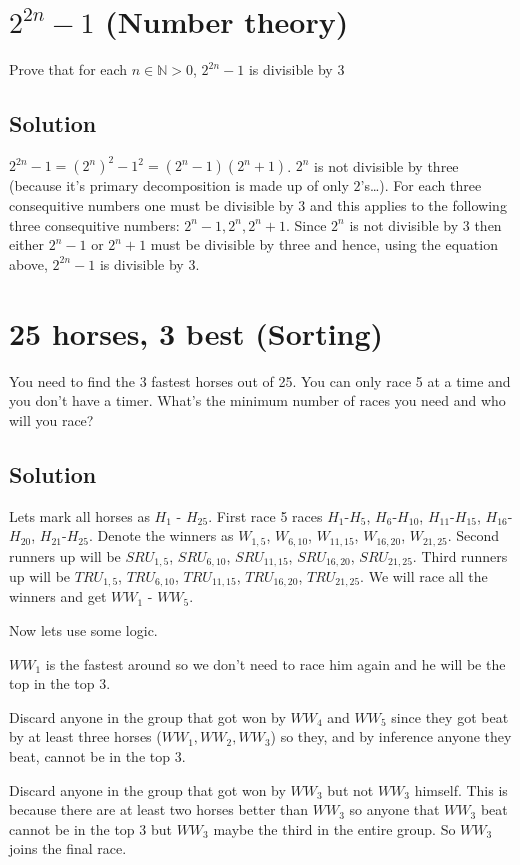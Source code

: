 \documentclass{article}
\begin{document}
\section{$2^{2n}-1$ (Number theory)}
Prove that for each $n\in \mathbb{N}>0$, $2^{2n}-1$ is divisible by 3

\subsection{Solution}
$2^{2n}-1=(2^{n})^2-1^2=(2^n-1)(2^n+1)$.
$2^n$ is not divisible by three (because it's primary decomposition is made up of only $2$'s\ldots).
For each three consequitive numbers one must be divisible by $3$ and this applies to the following
three consequitive numbers: $2^n-1,2^n,2^n+1$. Since $2^n$ is not divisible by $3$ then either
$2^n-1$ or $2^n+1$ must be divisible by three and hence, using the equation above, $2^{2n}-1$ is
divisible by $3$.

\section{25 horses, 3 best (Sorting)}
You need to find the 3 fastest horses out of 25. You can only race 5 at a time and you don't have a timer. What's
the minimum number of races you need and who will you race?

\subsection{Solution}
Lets mark all horses as $H_1$ - $H_{25}$.
First race 5 races $H_1$-$H_5$, $H_6$-$H_{10}$, $H_{11}$-$H_{15}$, $H_{16}$-$H_{20}$, $H_{21}$-$H_{25}$.
Denote the winners as $W_{1,5}$, $W_{6,10}$, $W_{11,15}$, $W_{16,20}$, $W_{21,25}$. 
Second runners up will be $SRU_{1,5}$, $SRU_{6,10}$, $SRU_{11,15}$, $SRU_{16,20}$, $SRU_{21,25}$.
Third runners up will be $TRU_{1,5}$, $TRU_{6,10}$, $TRU_{11,15}$, $TRU_{16,20}$, $TRU_{21,25}$.
We will race all the winners and get $WW_1$ - $WW_5$.

Now lets use some logic.

$WW_1$ is the fastest around so we don't need to race him again and he will be the top in the top 3.

Discard anyone in the group that got won by $WW_4$ and $WW_5$ since they got beat by at least three horses ($WW_1, WW_2, WW_3$) so they, and by inference anyone they beat, cannot be in the top 3.

Discard anyone in the group that got won by $WW_3$ but not $WW_3$ himself. This is because there are at least two horses better than $WW_3$ so anyone that $WW_3$ beat cannot be in the top 3 but $WW_3$ maybe the third in the entire group. So $WW_3$ joins the final race.
\end{document}
